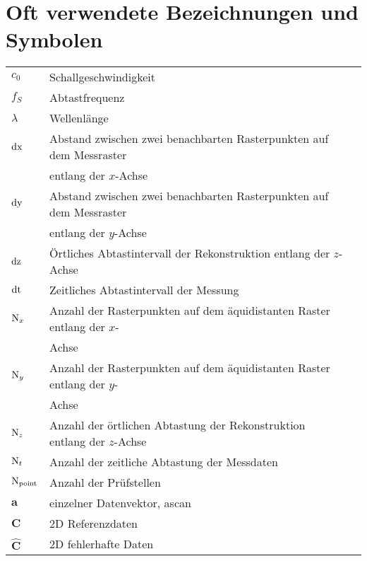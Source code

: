 \section*{Oft verwendete Bezeichnungen und Symbolen}
\begin{flushleft}
\normalsize
\begin{tabular}{l l l}
$c_0$ & Schallgeschwindigkeit\\
$f_{S}$ & Abtastfrequenz \\
$\lambda$ &  Wellenlänge\\
$\operatorname{dx}$  & Abstand zwischen zwei benachbarten Rasterpunkten auf dem Messraster \\ & entlang der $x$-Achse \\
$\operatorname{dy}$  & Abstand zwischen zwei benachbarten Rasterpunkten auf dem Messraster \\ & entlang der $y$-Achse \\
$\operatorname{dz}$  & Örtliches Abtastintervall der Rekonstruktion entlang der $z$-Achse \\
$\operatorname{dt}$  & Zeitliches Abtastintervall der Messung \\
$\operatorname{N}_x$  & Anzahl der Rasterpunkten auf dem äquidistanten Raster entlang der $x$-\\ & Achse \\
$\operatorname{N}_y$  & Anzahl der Rasterpunkten auf dem äquidistanten Raster entlang der $y$-\\ & Achse \\
$\operatorname{N}_z$  & Anzahl der örtlichen Abtastung der Rekonstruktion entlang der $z$-Achse \\
$\operatorname{N}_t$  & Anzahl der zeitliche Abtastung der Messdaten \\
$\operatorname{N}_{\operatorname{point}}$  & Anzahl der Prüfstellen \\
$\bm{a}$ & einzelner Datenvektor, \gls{ascan} \\
$\bm{C}$ & 2D Referenzdaten \\
$\hat{\bm{C}} $ & 2D fehlerhafte Daten \\
\end{tabular}
\end{flushleft}